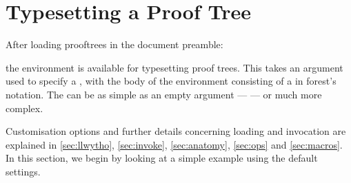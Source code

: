 \documentclass[10pt,british,a4paper]{ltxdoc}
\newcommand*\pkg[1]{\textsf{#1}}
\begin{document}
\section{Typesetting a Proof Tree}\label{sec:ee}

After loading \pkg{prooftrees} in the document preamble:
\begin{latexcode}
\usepackage{prooftrees}
\end{latexcode}
the  environment is available for typesetting proof trees.
This takes an argument used to specify a , with the body of the environment consisting of a  in \pkg{forest}'s notation.
The  can be as simple as an empty argument --- \arg{} --- or much more complex.

Customisation options and further details concerning loading and invocation are explained in \cref{sec:llwytho}, \cref{sec:invoke}, \cref{sec:anatomy}, \cref{sec:ops} and \cref{sec:macros}.
In this section, we begin by looking at a simple example using the default settings.
\end{document}
